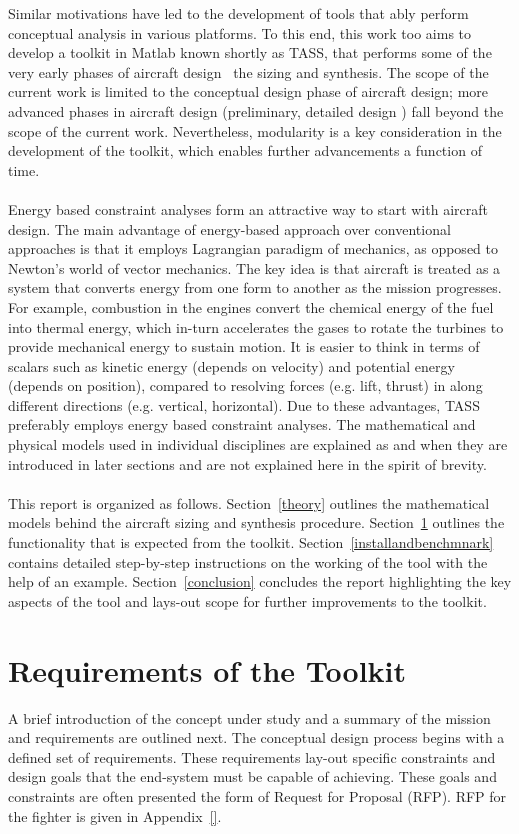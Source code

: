 \documentclass[pdftex,11pt,letter]{article}
\begin{document}
Similar motivations have led to the development of tools that ably perform conceptual analysis in various platforms\cite{Raymer2004, Kroo2005}. To this end, this work too aims to develop a toolkit in Matlab\cite{MATLAB} known shortly as TASS, that performs some of the very early phases of aircraft design \ie~the sizing and synthesis. The scope of the current work is limited to the conceptual design phase of aircraft design; more advanced phases in aircraft design (preliminary, detailed design \etc) fall beyond the scope of the current work. Nevertheless, modularity is a key consideration in the development of the toolkit, which enables further advancements a function of time.
\\\\
Energy based constraint analyses form an attractive way to start with aircraft design. The main advantage of energy-based approach over conventional approaches is that it employs Lagrangian paradigm of mechanics, as opposed to Newton's world of vector mechanics. The key idea is that aircraft is treated as a system that converts energy from one form to another as the mission progresses. For example, combustion in the engines convert the chemical energy of the fuel into thermal energy, which in-turn accelerates the gases to rotate the turbines to provide mechanical energy to sustain motion. It is easier to think in terms of scalars such as kinetic energy (depends on velocity) and potential energy (depends on position), compared to resolving forces (e.g. lift, thrust) in along different directions (e.g. vertical, horizontal). Due to these advantages, \textsc{TASS} preferably employs energy based constraint analyses. The mathematical and physical models used in individual disciplines are explained as and when they are introduced in later sections and are not explained here in the spirit of brevity.
\\\\
This report is organized as follows. Section~\ref{theory} outlines the mathematical models behind the aircraft sizing and synthesis procedure. Section~\ref{requirements} outlines the functionality that is expected from the toolkit. Section~\ref{installandbenchmnark} contains detailed step-by-step instructions on the working of the tool with the help of an example. Section~\ref{conclusion} concludes the report highlighting the key aspects of the tool and lays-out scope for further improvements to the toolkit. 

\section{Requirements of the Toolkit}\label{requirements}
A brief introduction of the concept under study and a summary of the mission and requirements are  outlined next. The conceptual design process begins with a defined set of requirements. These requirements lay-out specific constraints and design goals that the end-system must be capable of achieving.  These goals and constraints are often presented the form of Request for Proposal (RFP). RFP for the fighter is given in Appendix~\ref{}. 
\end{document}

